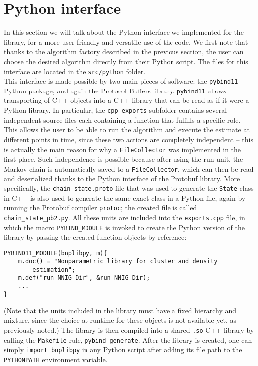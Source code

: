 \chapter{Python interface} \label{chap-py-int}

In this section we will talk about the Python interface we implemented for the library, for a more user-friendly and versatile use of the code.
We first note that thanks to the algorithm factory described in the previous section, the user can choose the desired algorithm directly from their Python script.
The files for this interface are located in the \verb|src/python| folder. \\
This interface is made possible by two main pieces of software: the \verb|pybind11| Python package, and again the Protocol Buffers library.
\verb|pybind11| allows transporting of C++ objects into a C++ library that can be read as if it were a Python library.
In particular, the \verb|cpp_exports| subfolder contains several independent source files each containing a function that fulfills a specific role.
This allows the user to be able to run the algorithm and execute the estimate at different points in time, since these two actions are completely independent -- this is actually the main reason for why a \verb|FileCollector| was implemented in the first place.
Such independence is possible because after using the run unit, the Markov chain is automatically saved to a \verb|FileCollector|, which can then be read and deserialized thanks to the Python interface of the Protobuf library.
More specifically, the \verb|chain_state.proto| file that was used to generate the \verb|State| class in C++ is also used to generate the same exact class in a Python file, again by running the Protobuf compiler \verb|protoc|; the created file is called \verb|chain_state_pb2.py|.
All these units are included into the \verb|exports.cpp| file, in which the macro \verb|PYBIND_MODULE| is invoked to create the Python version of the library by passing the created function objects by reference:
\begin{verbatim}
PYBIND11_MODULE(bnplibpy, m){
    m.doc() = "Nonparametric library for cluster and density
        estimation";
    m.def("run_NNIG_Dir", &run_NNIG_Dir);
    ...
}
\end{verbatim}
(Note that the units included in the library must have a fixed hierarchy and mixture, since the choice at runtime for these objects is not available yet, as previously noted.)
The library is then compiled into a shared \verb|.so| C++ library by calling the \verb|Makefile| rule, \verb|pybind_generate|.
After the library is created, one can simply \verb|import bnplibpy| in any Python script after adding its file path to the \verb|PYTHONPATH| environment variable.

